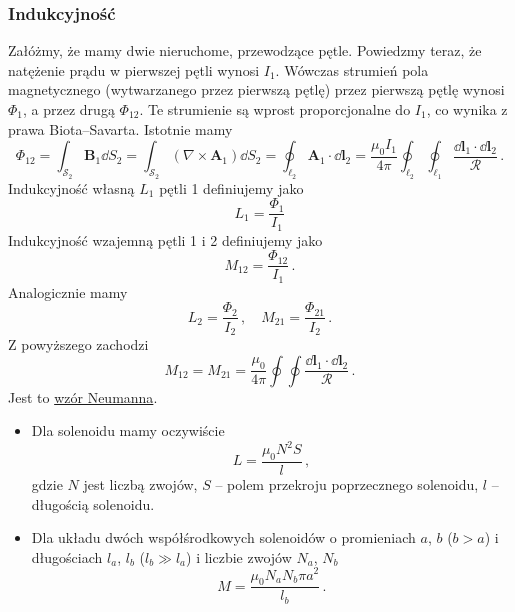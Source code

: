 \documentclass[../main.tex]{subfiles}
\begin{document}
\subsubsection{Indukcyjność}
Załóżmy, że mamy dwie nieruchome, przewodzące pętle. Powiedzmy teraz, że natężenie prądu w pierwszej pętli wynosi \(I_1\). Wówczas strumień pola magnetycznego (wytwarzanego przez pierwszą pętlę) przez pierwszą pętlę wynosi \(\Phi_1\), a przez drugą \(\Phi_{12}\). Te strumienie są wprost proporcjonalne do \(I_1\), co wynika z prawa Biota--Savarta. Istotnie mamy
\begin{equation*}
    \Phi_{12}=\int_{\mathcal{S}_2}\mathbf{B}_1\dd{S_2}=\int_{\mathcal{S}_2}(\nabla\times\mathbf{A}_1)\dd{S_2}=\oint_{\ell_2}\mathbf{A}_1\cdot\dd{\mathbf{l}_2}=\frac{\mu_0I_1}{4\pi}\oint_{\ell_2}\oint_{\ell_1}\frac{\dd{\mathbf{l}_1\cdot\dd{\mathbf{l}_2}}}{\mathcal{R}}\,.
\end{equation*}
Indukcyjność własną \(L_1\) pętli 1 definiujemy jako 
\begin{equation*}
    L_1=\frac{\Phi_1}{I_1}
\end{equation*}
Indukcyjność wzajemną pętli 1 i 2 definiujemy jako
\begin{equation*}
    M_{12}=\frac{\Phi_{12}}{I_1}\,.
\end{equation*}
Analogicznie mamy
\begin{equation*}
    L_2=\frac{\Phi_2}{I_2}\,,\quad M_{21}=\frac{\Phi_{21}}{I_2}\,.
\end{equation*}
Z powyższego zachodzi
\begin{equation*}
    M_{12}=M_{21}=\frac{\mu_0}{4\pi}\oint\oint\frac{\dd{\mathbf{l}_1\cdot\dd{\mathbf{l}_2}}}{\mathcal{R}}\,.
\end{equation*}
Jest to \underline{wzór Neumanna}. 

\begin{itemize}
    \item Dla solenoidu mamy oczywiście
    \begin{equation*}
        L=\frac{\mu_0N^2S}{l}\,,
    \end{equation*}
    gdzie \(N\) jest liczbą zwojów, \(S\) -- polem przekroju poprzecznego solenoidu, \(l\) -- długością solenoidu.
    
    \item Dla układu dwóch współśrodkowych solenoidów o promieniach \(a\), \(b\) (\(b>a\)) i długościach \(l_a\), \(l_b\) (\(l_b\gg l_a\)) i liczbie zwojów \(N_a\), \(N_b\)
    \begin{equation*}
        M=\frac{\mu_0N_aN_b\pi a^2}{l_b}\,.
    \end{equation*}
\end{itemize}
\end{document}

